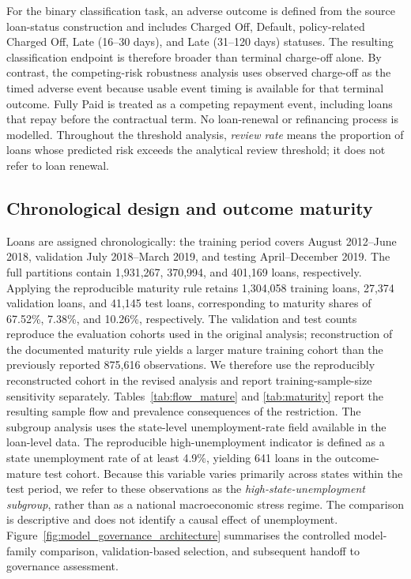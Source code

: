 \documentclass[10pt]{article}
\begin{document}
For the binary classification task, an adverse outcome is defined from the source loan-status construction and includes Charged Off, Default, policy-related Charged Off, Late (16--30 days), and Late (31--120 days) statuses. The resulting classification endpoint is therefore broader than terminal charge-off alone. By contrast, the competing-risk robustness analysis uses observed charge-off as the timed adverse event because usable event timing is available for that terminal outcome. Fully Paid is treated as a competing repayment event, including loans that repay before the contractual term. No loan-renewal or refinancing process is modelled. Throughout the threshold analysis, \emph{review rate} means the proportion of loans whose predicted risk exceeds the analytical review threshold; it does not refer to loan renewal.

\subsection{Chronological design and outcome maturity}

Loans are assigned chronologically: the training period covers August 2012--June 2018, validation July 2018--March 2019, and testing April--December 2019. The full partitions contain 1,931,267, 370,994, and 401,169 loans, respectively. Applying the reproducible maturity rule retains 1,304,058 training loans, 27,374 validation loans, and 41,145 test loans, corresponding to maturity shares of 67.52\%, 7.38\%, and 10.26\%, respectively. The validation and test counts reproduce the evaluation cohorts used in the original analysis; reconstruction of the documented maturity rule yields a larger mature training cohort than the previously reported 875,616 observations. We therefore use the reproducibly reconstructed cohort in the revised analysis and report training-sample-size sensitivity separately. Tables~\ref{tab:flow_mature} and \ref{tab:maturity} report the resulting sample flow and prevalence consequences of the restriction. The subgroup analysis uses the state-level unemployment-rate field available in the loan-level data. The reproducible high-unemployment indicator is defined as a state unemployment rate of at least 4.9\%, yielding 641 loans in the outcome-mature test cohort. Because this variable varies primarily across states within the test period, we refer to these observations as the \emph{high-state-unemployment subgroup}, rather than as a national macroeconomic stress regime. The comparison is descriptive and does not identify a causal effect of unemployment. Figure~\ref{fig:model_governance_architecture} summarises the controlled model-family comparison, validation-based selection, and subsequent handoff to governance assessment.
\end{document}
